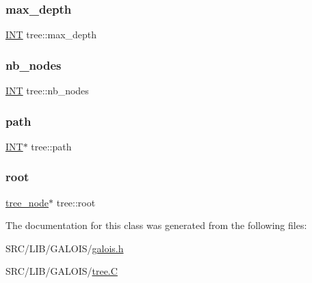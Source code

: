 \mbox{\label{classtree_a20f34d31ef80e9265b865ed6800c14ab}} 
\subsubsection{\texorpdfstring{max\+\_\+depth}{max\_depth}}
{\footnotesize\ttfamily \mbox{\hyperlink{galois_8h_a09fddde158a3a20bd2dcadb609de11dc}{I\+NT}} tree\+::max\+\_\+depth}

\mbox{\label{classtree_a1598e622c5d7587f8d3fe4b9318e0156}} 
\subsubsection{\texorpdfstring{nb\+\_\+nodes}{nb\_nodes}}
{\footnotesize\ttfamily \mbox{\hyperlink{galois_8h_a09fddde158a3a20bd2dcadb609de11dc}{I\+NT}} tree\+::nb\+\_\+nodes}

\mbox{\label{classtree_a318299f8ef67bf2ed2a5a9a089a13f1b}} 
\subsubsection{\texorpdfstring{path}{path}}
{\footnotesize\ttfamily \mbox{\hyperlink{galois_8h_a09fddde158a3a20bd2dcadb609de11dc}{I\+NT}}$\ast$ tree\+::path}

\mbox{\label{classtree_a8772da48b43717359cbf9fb969e090d0}} 
\subsubsection{\texorpdfstring{root}{root}}
{\footnotesize\ttfamily \mbox{\hyperlink{classtree__node}{tree\+\_\+node}}$\ast$ tree\+::root}



The documentation for this class was generated from the following files\+:\begin{DoxyCompactItemize}
\item 
S\+R\+C/\+L\+I\+B/\+G\+A\+L\+O\+I\+S/\mbox{\hyperlink{galois_8h}{galois.\+h}}\item 
S\+R\+C/\+L\+I\+B/\+G\+A\+L\+O\+I\+S/\mbox{\hyperlink{tree_8_c}{tree.\+C}}\end{DoxyCompactItemize}
